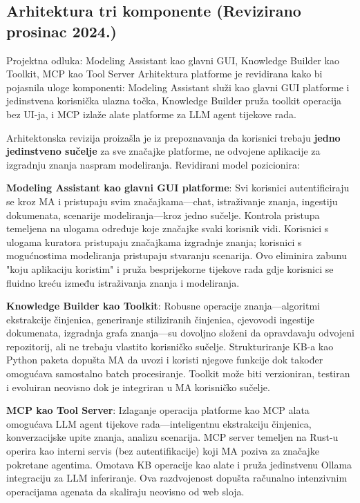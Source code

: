 \documentclass[12pt,a4paper]{article}
\begin{document}
\subsection{Arhitektura tri komponente (Revizirano prosinac 2024.)}

\begin{rationale}{Projektna odluka: Modeling Assistant kao glavni GUI, Knowledge Builder kao Toolkit, MCP kao Tool Server}
Arhitektura platforme je revidirana kako bi pojasnila uloge komponenti: Modeling Assistant služi kao glavni GUI platforme i jedinstvena korisnička ulazna točka, Knowledge Builder pruža toolkit operacija bez UI-ja, i MCP izlaže alate platforme za LLM agent tijekove rada.
\end{rationale}

Arhitektonska revizija proizašla je iz prepoznavanja da korisnici trebaju \textbf{jedno jedinstveno sučelje} za sve značajke platforme, ne odvojene aplikacije za izgradnju znanja naspram modeliranja. Revidirani model pozicionira:

\textbf{Modeling Assistant kao glavni GUI platforme}: Svi korisnici autentificiraju se kroz MA i pristupaju svim značajkama—chat, istraživanje znanja, ingestiju dokumenata, scenarije modeliranja—kroz jedno sučelje. Kontrola pristupa temeljena na ulogama određuje koje značajke svaki korisnik vidi. Korisnici s ulogama kuratora pristupaju značajkama izgradnje znanja; korisnici s mogućnostima modeliranja pristupaju stvaranju scenarija. Ovo eliminira zabunu "koju aplikaciju koristim" i pruža besprijekorne tijekove rada gdje korisnici se fluidno kreću između istraživanja znanja i modeliranja.

\textbf{Knowledge Builder kao Toolkit}: Robusne operacije znanja—algoritmi ekstrakcije činjenica, generiranje stiliziranih činjenica, cjevovodi ingestije dokumenata, izgradnja grafa znanja—su dovoljno složeni da opravdavaju odvojeni repozitorij, ali ne trebaju vlastito korisničko sučelje. Strukturiranje KB-a kao Python paketa dopušta MA da uvozi i koristi njegove funkcije dok također omogućava samostalno batch procesiranje. Toolkit može biti verzioniran, testiran i evoluiran neovisno dok je integriran u MA korisničko sučelje.

\textbf{MCP kao Tool Server}: Izlaganje operacija platforme kao MCP alata omogućava LLM agent tijekove rada—inteligentnu ekstrakciju činjenica, konverzacijske upite znanja, analizu scenarija. MCP server temeljen na Rust-u operira kao interni servis (bez autentifikacije) koji MA poziva za značajke pokretane agentima. Omotava KB operacije kao alate i pruža jedinstvenu Ollama integraciju za LLM inferiranje. Ova razdvojenost dopušta računalno intenzivnim operacijama agenata da skaliraju neovisno od web sloja.
\end{document}

